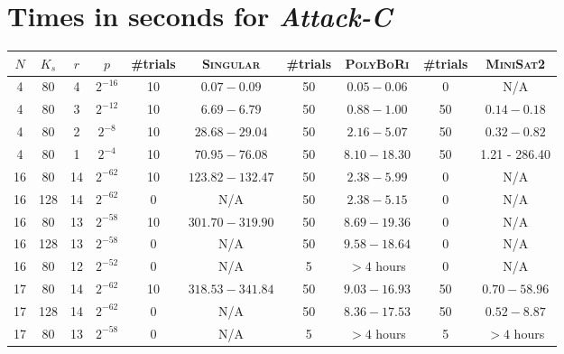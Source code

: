 \documentclass{llncs}
\begin{document}
\section{Times in seconds for \emph{Attack-C}}
\label{app:present-att-c}
\begin{table}
\begin{center}
\begin{tabular}{|c|c|c|c|c|c|c|c|c|c|}
\hline
$N$ & $K_s$ & $r$ & $p$ & \#trials & \textsc{Singular}& \#trials &
\textsc{PolyBoRi} & \#trials & \textsc{MiniSat2}\\
\hline
 4 &  80 &  4 & $2^{-16}$ & 10 & $ 0.07 -  0.09$ & 50 & $0.05 -  0.06$ & 0 &
N/A\\
 4 &  80 &  3 & $2^{-12}$ & 10 & $ 6.69 -  6.79$ & 50 & $0.88 -  1.00$ & 50 &
$0.14 - 0.18$\\
 4 &  80 &  2 &  $2^{-8}$ & 10 & $28.68 - 29.04$ & 50 & $2.16 -  5.07$ & 50 &
$0.32 - 0.82$\\
 4 &  80 &  1 &  $2^{-4}$ & 10 & $70.95 - 76.08$ & 50 & $8.10 - 18.30$ & 50 &
1.21 - 286.40\\
\hline
16 &  80 & 14 & $2^{-62}$ & 10 & $123.82 -  132.47$ & 50 & $2.38 -  5.99$ &
0 & N/A\\
16 & 128 & 14 & $2^{-62}$ &  0 & N/A                & 50 & $2.38 -  5.15$ & 
0 & N/A\\
16 &  80 & 13 & $2^{-58}$ & 10 & $301.70 -  319.90$ & 50 & $8.69 - 19.36$ & 
0 & N/A\\
16 & 128 & 13 & $2^{-58}$ &  0 & N/A                & 50 & $9.58 - 18.64$ & 
0 & N/A\\
16 &  80 & 12 & $2^{-52}$ &  0 & N/A                &  5 & $>4$ hours  & 
0 & N/A\\
\hline
17 &  80 & 14 & $2^{-62}$ & 10 & $318.53 - 341.84$ & 50 & $9.03 - 16.93$  &
50 & $0.70 - 58.96$\\
17 & 128 & 14 & $2^{-62}$ &  0 & N/A & 50 & $8.36 - 17.53$  & 50 & $0.52 -
8.87$\\
17 &  80 & 13 & $2^{-58}$ &  0 & N/A &  5 & $>4$ hours  & 5 & $>4$ hours\\
\hline
\end{tabular}
\end{center}
\label{table:present-att-c}
\end{table}
\end{document}
